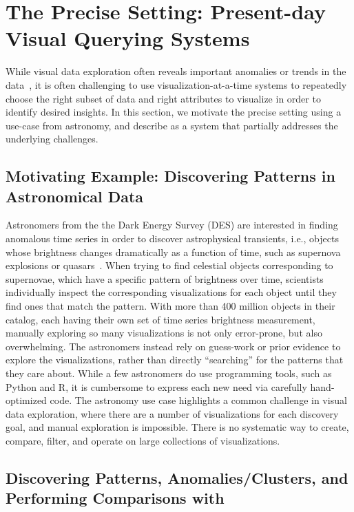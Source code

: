 
\section{The Precise Setting: Present-day Visual Querying Systems}\label{sec:precise}
While visual data exploration often reveals 
important anomalies or trends 
in the data~\cite{Heer2012,Morton2014}, 
it is often challenging to 
use visualization-at-a-time systems to 
repeatedly choose the right subset of 
data and right attributes to visualize
in order to identify desired insights.
In this section, we motivate
the precise setting using a use-case from
astronomy, and describe \zv as a system
that partially addresses the underlying challenges.

\subsection{Motivating Example: Discovering Patterns in Astronomical Data}
Astronomers from the the Dark Energy Survey (DES) 
are interested in finding 
anomalous time series 
in order to discover 
astrophysical transients, 
i.e., objects whose brightness 
changes dramatically as a function of time, 
such as supernova explosions or quasars~\cite{Drlica-Wagner2017}. 
When trying to find celestial objects 
corresponding to supernovae, 
which have a specific pattern of brightness over time, 
scientists individually inspect the corresponding 
visualizations for each object until 
they find ones that match the pattern. 
With more than 400 million objects in their catalog, 
each having their own set of time series brightness measurement, 
manually exploring so many 
visualizations is not only error-prone, 
but also overwhelming.
The astronomers instead rely on guess-work 
or prior evidence to explore the visualizations,
rather than directly ``searching'' for the patterns
that they care about. 
While a few astronomers do use 
programming tools, such as Python and R,
it is cumbersome to express each new need
via carefully hand-optimized code. 
The astronomy use case highlights a 
common challenge in visual data exploration,
where there are a number of visualizations
for each discovery goal,
and manual exploration is impossible.
There is no systematic way to create, compare, filter,
and operate on large collections of visualizations.

\subsection{Discovering Patterns, Anomalies/Clusters, and Performing Comparisons with \zv}


